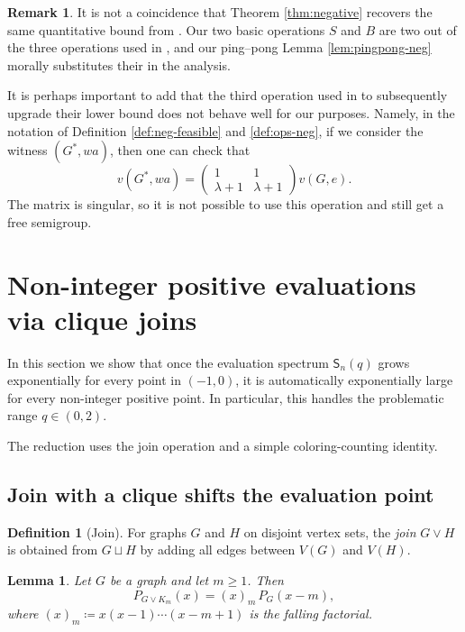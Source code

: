 \documentclass[A4paper,reqno,oneside,12pt]{amsart}
\theoremstyle{plain}
\newtheorem{lemma}[theorem]{Lemma}
\theoremstyle{definition}
\newtheorem{remark}[theorem]{Remark}
\newtheorem{definition}[theorem]{Definition}
\begin{document}
\begin{remark}
    It is not a coincidence that Theorem \ref{thm:negative} recovers the same quantitative bound from \cite[Corollary 2.6]{ABG}. Our two basic operations $S$ and $B$ are two out of the three operations used in \cite{ABG}, and our ping--pong Lemma \ref {lem:pingpong-neg} morally substitutes their \cite[Theorem 2.5]{ABG} in the analysis. 
    
    It is perhaps important to add that the third operation used in \cite{ABG} to subsequently upgrade their lower bound does not behave well for our purposes. Namely, in the notation of Definition \ref{def:neg-feasible} and \ref{def:ops-neg}, if we consider the witness $(G^\ast, wa)$, then one can check that 
\begin{equation*}
    v(G^\ast, wa) = \begin{pmatrix}
        1 & 1 \\ 
        \lambda +1 & \lambda + 1
    \end{pmatrix} v(G,e).
\end{equation*}
The matrix is singular, so it is not possible to use this operation and still get a free semigroup.
\end{remark}
\section{Non-integer positive evaluations via clique joins}\label{sec:noninteger}

In this section we show that once the evaluation spectrum $\mathsf{S}_n(q)$ grows exponentially for every point in $(-1,0)$, it is automatically exponentially large for every non-integer positive point. In particular, this handles the problematic range $q \in (0,2)$. 


The reduction uses the join operation and a simple coloring-counting identity. 

\subsection{Join with a clique shifts the evaluation point}

\begin{definition}[Join]
For graphs $G$ and $H$ on disjoint vertex sets, the \emph{join} $G\vee H$
is obtained from $G\sqcup H$ by adding all edges between $V(G)$ and $V(H)$.
\end{definition}

\begin{lemma}\label{lem:join-shift}
Let $G$ be a graph and let $m\ge 1$. Then
\begin{equation}\label{eq:join-shift}
P_{G\vee K_m}(x)=(x)_m\,P_G(x-m),
\end{equation}
where $(x)_m\coloneqq x(x-1)\cdots(x-m+1)$ is the falling factorial.
\end{lemma}
\end{document}
